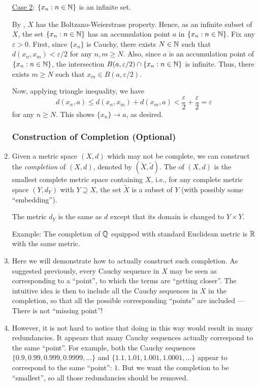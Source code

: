 \begin{enumerate}
\begin{pf}
\underline{Case 2}: \(\{x_n:n\in\mathbb{N}\}\) is an infinite set.

By , \(X\) has the Boltzano-Weierstrass property. Hence,
as an infinite subset of \(X\), the set \(\{x_n:n\in\mathbb{N}\}\) has an accumulation
point \(a\) in \(\{x_n:n\in\mathbb{N}\}\). Fix any \(\varepsilon>0\). First, since
\(\{x_n\}\) is Cauchy, there exists \(N\in\mathbb{N}\) such that
\(d(x_n,x_m)<\varepsilon/2\) for any \(n,m\ge N\). Also, since \(a\) is an
accumulation point of \(\{x_n:n\in\mathbb{N}\}\), the intersection
\(B(a,\varepsilon/2)\cap\{x_n:n\in\mathbb{N}\}\) is infinite. Thus, there exists \(m\ge
N\) such that \(x_m\in B(a,\varepsilon/2)\).

Now, applying triangle inequality, we have
\[
d(x_n,a)\le d(x_n,x_m)+d(x_m,a)<\frac{\varepsilon}{2}+\frac{\varepsilon}{2}=\varepsilon
\]
for any \(n\ge N\). This shows \(\{x_n\}\to a\), as desired.
\end{pf}

\subsubsection*{Construction of Completion (Optional)}
\item Given a metric space \((X,d)\) which may not be complete, we can
construct the \emph{completion} of \((X,d)\), denoted by
\((\widetilde{X},\widetilde{d})\). The  of \((X,d)\) is the
smallest complete metric space containing \(X\), i.e., for any complete metric
space \((Y,d_Y)\) with \(Y\supseteq X\), the set \(\widetilde{X}\) is a subset
of \(Y\) (with possibly some ``embedding''). \begin{note}
The metric \(d_Y\) is the same as \(d\) except that its domain is changed to
\(Y\times Y\).
\end{note}

Example: The completion of \(\mathbb{Q}\) equipped with standard Euclidean metric is
\(\mathbb{R}\) with the same metric.

\item Here we will demonstrate how to actually construct such completion.
As suggested previously, every Cauchy sequence in \(X\) may be seen as
corresponding to a ``point'', to which the terms are ``getting closer''. The
intuitive idea is then to include all the Cauchy sequences in \(X\) in the
completion, so that all the possible corresponding ``points'' are included ---
There is not ``missing point''!

\item However, it is not hard to notice that doing in this way would result in
many redundancies. It appears that many Cauchy sequences actually correspond to
the same ``point''. For example, both the Cauchy sequences \(\{0.9, 0.99,
0.999, 0.9999, \dotsc\}\) and \(\{1.1, 1.01, 1.001, 1.0001, \dotsc\}\) appear
to correspond to the same ``point'': \(1\). But we want the completion to be
``smallest'', so all those redundancies should be removed.


\end{enumerate}
